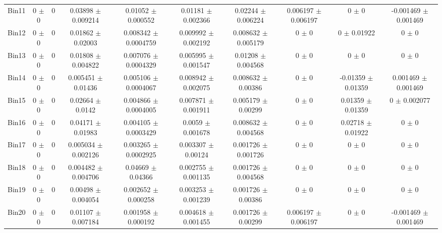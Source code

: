 \begin{tabular}{@{\extracolsep{4pt}}lccccccccc@{}}
     Bin11 & 0 $\pm$ 0 & 0 & 0.03898 $\pm$ 0.009214 & 0.01052 $\pm$ 0.000552 & 0.01181 $\pm$ 0.002366 & 0.02244 $\pm$ 0.006224 & 0.006197 $\pm$ 0.006197 & 0 $\pm$ 0 & -0.001469 $\pm$ 0.001469 \\ 
     Bin12 & 0 $\pm$ 0 & 0 & 0.01862 $\pm$ 0.02003 & 0.008342 $\pm$ 0.0004759 & 0.009992 $\pm$ 0.002192 & 0.008632 $\pm$ 0.005179 & 0 $\pm$ 0 & 0 $\pm$ 0.01922 & 0 $\pm$ 0 \\ 
     Bin13 & 0 $\pm$ 0 & 0 & 0.01808 $\pm$ 0.004822 & 0.007076 $\pm$ 0.0004329 & 0.005995 $\pm$ 0.001547 & 0.01208 $\pm$ 0.004568 & 0 $\pm$ 0 & 0 $\pm$ 0 & 0 $\pm$ 0 \\ 
     Bin14 & 0 $\pm$ 0 & 0 & 0.005451 $\pm$ 0.01436 & 0.005106 $\pm$ 0.0004067 & 0.008942 $\pm$ 0.002075 & 0.008632 $\pm$ 0.00386 & 0 $\pm$ 0 & -0.01359 $\pm$ 0.01359 & 0.001469 $\pm$ 0.001469 \\ 
     Bin15 & 0 $\pm$ 0 & 0 & 0.02664 $\pm$ 0.0142 & 0.004866 $\pm$ 0.0004005 & 0.007871 $\pm$ 0.001911 & 0.005179 $\pm$ 0.00299 & 0 $\pm$ 0 & 0.01359 $\pm$ 0.01359 & 0 $\pm$ 0.002077 \\ 
     Bin16 & 0 $\pm$ 0 & 0 & 0.04171 $\pm$ 0.01983 & 0.004105 $\pm$ 0.0003429 & 0.0059 $\pm$ 0.001678 & 0.008632 $\pm$ 0.004568 & 0 $\pm$ 0 & 0.02718 $\pm$ 0.01922 & 0 $\pm$ 0 \\ 
     Bin17 & 0 $\pm$ 0 & 0 & 0.005034 $\pm$ 0.002126 & 0.003265 $\pm$ 0.0002925 & 0.003307 $\pm$ 0.00124 & 0.001726 $\pm$ 0.001726 & 0 $\pm$ 0 & 0 $\pm$ 0 & 0 $\pm$ 0 \\ 
     Bin18 & 0 $\pm$ 0 & 0 & 0.004482 $\pm$ 0.004706 & 0.04669 $\pm$ 0.04366 & 0.002755 $\pm$ 0.001135 & 0.001726 $\pm$ 0.004568 & 0 $\pm$ 0 & 0 $\pm$ 0 & 0 $\pm$ 0 \\ 
     Bin19 & 0 $\pm$ 0 & 0 & 0.00498 $\pm$ 0.004054 & 0.002652 $\pm$ 0.000258 & 0.003253 $\pm$ 0.001239 & 0.001726 $\pm$ 0.00386 & 0 $\pm$ 0 & 0 $\pm$ 0 & 0 $\pm$ 0 \\ 
     Bin20 & 0 $\pm$ 0 & 0 & 0.01107 $\pm$ 0.007184 & 0.001958 $\pm$ 0.000192 & 0.004618 $\pm$ 0.001455 & 0.001726 $\pm$ 0.00299 & 0.006197 $\pm$ 0.006197 & 0 $\pm$ 0 & -0.001469 $\pm$ 0.001469 \\ 
\hline\hline
  \end{tabular}
